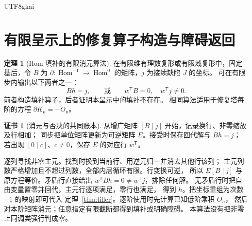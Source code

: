 \documentclass[12pt]{report}
\makeatletter
\theoremstyle{definition}
\newtheorem{theorem}{定理}[chapter]
\newtheorem{Certificate}{证书}[chapter]
\renewenvironment{proof}[1][\proofname]{\par
  \pushQED{\qed}\normalfont
  \topsep6\p@\@plus6\p@\relax
  \trivlist
  \item[\hskip\labelsep\normalfont #1\@addpunct{.}]\ignorespaces
}{
  \popQED\endtrivlist\@endpefalse
}
\newcommand{\Hom}{\operatorname{Hom}}
\makeatother
\begin{document}
\begin{CJK*}{UTF8}{gkai}
\section{有限呈示上的修复算子构造与障碍返回}
\label{sec:repair-algorithm}
\begin{theorem}[Hom 填补的有限消元算法]
\label{thm:elimination}
在有限维有理数复形或有限域复形中，固定基后，令 \(B\) 为
\(\partial:\Hom^{-1}\to\Hom^0\) 的矩阵，\(j\) 为接续缺陷 \(J\) 的坐标。
可在有限步内输出以下两者之一：
\[
Bh=j,\qquad\text{或}\qquad w^{\mathsf T}B=0,\quad w^{\mathsf T}j\ne0 .
\]
前者构造填补算子，后者证明本呈示中的填补不存在。
相同算法适用于修复塔每阶的方程 \(\partial K_n=-O_n\)。
\end{theorem}
\begin{Certificate}[消元与否决的共同账本]
从增广矩阵 \([B\mid j]\) 开始，记录换行、非零缩放及行相加；
同步把单位矩阵更新为可逆矩阵 \(E\)。接受时保存回代解与 \(Bh=j\)；
若出现 \([0\mid c]\)、\(c\ne0\)，保存 \(E\) 的对应行 \(w^{\mathsf T}\)。
\end{Certificate}
\begin{proof}
逐列寻找非零主元。找到时换到当前行、用逆元归一并消去其他行该列；
主元列数严格增加且不超过列数，全部内层循环有限。行变换可逆，
所以 \(E[B\mid j]\) 与原方程等价。矛盾行直接给出
\(w^{\mathsf T}Bh=0\ne w^{\mathsf T}j\)，排除任何解。
无矛盾行时把自由变量置零并回代，主元行逐项满足，零行也满足，
得到 \(h\)。把坐标重组为次数 \(-1\) 的映射即可代入
定理~\ref{thm:filler}。逐阶使用时先计算已知低阶乘积 \(O_n\)，
然后对本阶矩阵消元；任意指定有限截断都得到填补或明确障碍。
本算法没有把非零上同调类强行判成零。
\end{proof}


\end{CJK*}
\end{document}
